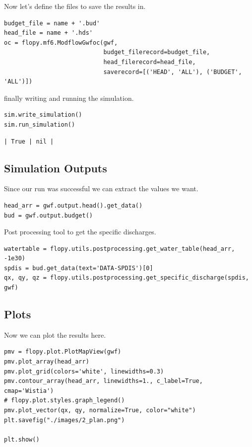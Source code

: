 \documentclass[titlepage,12pt]{unisubmission}
\begin{document}
Now let's define the files to save the results in.

\begin{verbatim}
budget_file = name + '.bud'
head_file = name + '.hds'
oc = flopy.mf6.ModflowGwfoc(gwf,
                            budget_filerecord=budget_file,
                            head_filerecord=head_file,
                            saverecord=[('HEAD', 'ALL'), ('BUDGET', 'ALL')])
\end{verbatim}

finally writing and running the simulation.

\begin{verbatim}
sim.write_simulation()
sim.run_simulation()
\end{verbatim}

\begin{verbatim}
| True | nil |
\end{verbatim}

\subsection{Simulation Outputs}
\label{sec:org2fb2d27}

Since our run was successful we can extract the values we want.
\begin{verbatim}
head_arr = gwf.output.head().get_data()
bud = gwf.output.budget()
\end{verbatim}

Post processing tool to get the specific discharges.

\begin{verbatim}
watertable = flopy.utils.postprocessing.get_water_table(head_arr, -1e30)
spdis = bud.get_data(text='DATA-SPDIS')[0]
qx, qy, qz = flopy.utils.postprocessing.get_specific_discharge(spdis, gwf)
\end{verbatim}

\subsection{Plots}
\label{sec:orgc8c7ef9}

Now we can plot the results here.

\begin{verbatim}
pmv = flopy.plot.PlotMapView(gwf)
pmv.plot_array(head_arr)
pmv.plot_grid(colors='white', linewidths=0.3)
pmv.contour_array(head_arr, linewidths=1., c_label=True, cmap='Wistia')
# flopy.plot.styles.graph_legend()
pmv.plot_vector(qx, qy, normalize=True, color="white")
plt.savefig("./images/2_plan.png")

plt.show()
\end{verbatim}
\end{document}

